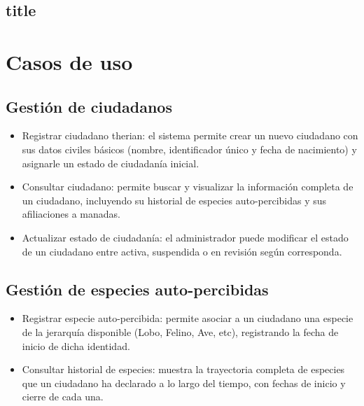 \documentclass[man]{apa7}
\begin{document}
	\subsection{title}
	
	\newpage
	
	\section*{Casos de uso}\label{sec:Casos de uso}
	
	\subsection{Gestión de ciudadanos}
		\begin{itemize}
			\item Registrar ciudadano therian: el sistema permite crear un nuevo ciudadano con sus datos civiles básicos (nombre, identificador único y fecha de nacimiento) y asignarle un estado de ciudadanía inicial.
			\item Consultar ciudadano: permite buscar y visualizar la información completa de un ciudadano, incluyendo su historial de especies auto-percibidas y sus afiliaciones a manadas.
			\item Actualizar estado de ciudadanía: el administrador puede modificar el estado de un ciudadano entre activa, suspendida o en revisión según corresponda.
		\end{itemize}
	\subsection{Gestión de especies auto-percibidas}
		\begin{itemize}
			\item Registrar especie auto-percibida: permite asociar a un ciudadano una especie de la jerarquía disponible (Lobo, Felino, Ave, etc), registrando la fecha de inicio de dicha identidad.
			\item Consultar historial de especies: muestra la trayectoria completa de especies que un ciudadano ha declarado a lo largo del tiempo, con fechas de inicio y cierre de cada una.
		\end{itemize}
\end{document}

